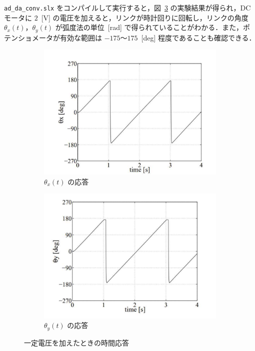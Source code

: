 \noindent
\texttt{ad\_da\_conv.slx} をコンパイルして実行すると，図~\ref{fig:response_under_constant_voltage} の実験結果が得られ，DCモータに $2$~[V] の電圧を加えると，リンクが時計回りに回転し，リンクの角度 $\theta_{x}(t)$，$\theta_{y}(t)$ が弧度法の単位~[rad] で得られていることがわかる．また，ポテンショメータが有効な範囲は $-175$～$175$~[deg] 程度であることも確認できる．

\begin{figure}[htbp]
    \centering
    \begin{subfigure}[b]{0.45\linewidth}
        \centering
        \includegraphics[width=\linewidth]{figure/thetax_response.pdf}
        \caption{$\theta_{x}(t)$ の応答}
        \label{fig:thetax_response}
    \end{subfigure}
    \hfill
    \begin{subfigure}[b]{0.45\linewidth}
        \centering
        \includegraphics[width=\linewidth]{figure/thetay_response.pdf}
        \caption{$\theta_{y}(t)$ の応答}
        \label{fig:thetay_response}
    \end{subfigure}
    \caption{一定電圧を加えたときの時間応答}
    \label{fig:response_under_constant_voltage}
\end{figure}
